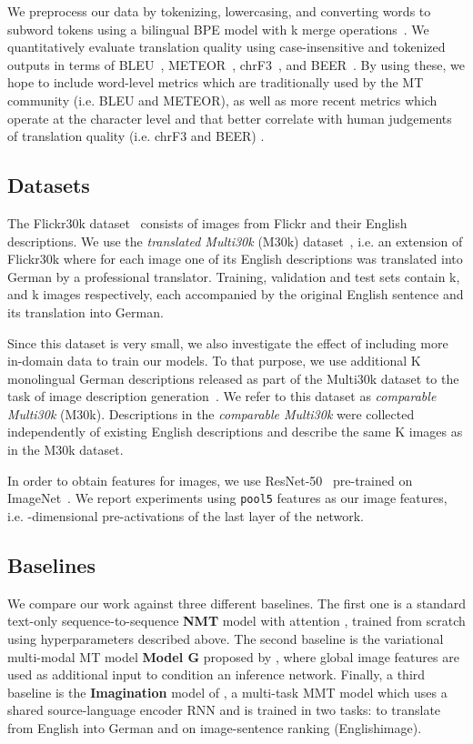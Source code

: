 \documentclass[11pt,a4paper]{article}
\begin{document}
We preprocess our data by tokenizing, lowercasing, and converting words to subword tokens using a bilingual BPE model with k merge operations~\cite{Sennrichetal2016}.
We quantitatively evaluate translation quality using case-insensitive and tokenized outputs in terms of BLEU~\cite{Papinenietal2002}, METEOR~\cite{DenkowskiLavie2014}, chrF3~\cite{Popovic2015}, and BEER~\cite{Stanojevic2014}.
By using these, we hope to include word-level metrics which are traditionally used by the MT community (i.e. BLEU and METEOR), as well as more recent metrics which operate at the character level and that better correlate with human judgements of translation quality (i.e. chrF3 and BEER) \citep{Bojaretal2017}.




\subsection{Datasets}\label{sec:data}
The Flickr30k dataset~\cite{Youngetal2014} consists of images from Flickr and their English descriptions.
We use the \emph{translated Multi30k} (M30k) dataset~\citep{ElliottFrankSimaanSpecia2016}, i.e. an extension of Flickr30k where for each image one of its English descriptions was translated into German by a professional translator. Training, validation and test sets contain k,  and k images respectively, each accompanied by the original English sentence and its translation into German.

Since this dataset is very small, we also investigate the effect of including more in-domain data to train our models.
To that purpose, we use additional K monolingual German descriptions released as part of the Multi30k dataset to the task of image description generation~\citep{ElliottFrankSimaanSpecia2016}.
We refer to this dataset as \emph{comparable Multi30k} (M30k).
Descriptions in the \emph{comparable Multi30k} were collected independently of existing English descriptions and describe the same K images as in the M30k dataset.

In order to obtain features for images, we use ResNet-50~\citep{He2015} pre-trained on ImageNet~\citep{ILSVRC15}.
We report experiments using
\texttt{pool5} features as our image features, i.e. -dimensional pre-activations of the last layer of the network.


\subsection{Baselines}\label{sec:baselines}
We compare our work against three different baselines.
The first one is a standard text-only sequence-to-sequence \textbf{NMT} model with attention 
\citep{Luongetal2015}, trained from scratch using hyperparameters described above.
The second baseline is the variational multi-modal MT model \textbf{Model G} proposed by \citet{Toyamaetal2016}, where global image features are used as additional input to condition an inference network.
Finally, a third baseline is the \textbf{Imagination} model of \citet{ElliottKadar2017}, a multi-task MMT model which uses a shared source-language encoder RNN and is trained in two tasks: to translate from English into German and on image-sentence ranking (Englishimage).
\end{document}
